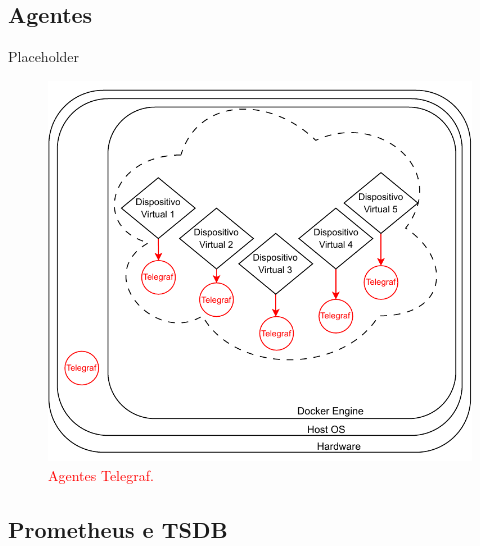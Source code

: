 {\subsection{Agentes}
\label{subsection:Agentes}

Placeholder

\begin{figure}[H]
\centering
\includegraphics[scale=1]{Imagens/chap03/by-blocks/agents_diagram.pdf}
\caption{\textcolor{red}{Agentes Telegraf.}}
\label{fig:DiagramaAgentes}
\end{figure}


\subsection{Prometheus e TSDB}
\label{subsection:PrometheusTSDB}

}
